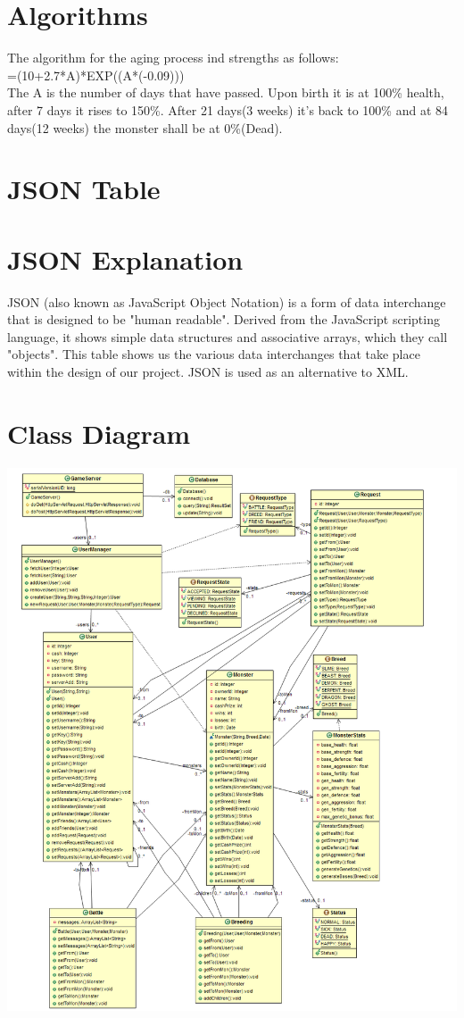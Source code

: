 \documentclass{project}
\begin{document}
\section{Algorithms}
The algorithm for the aging process ind strengths as follows:\\
=(10+2.7*A)*EXP((A*(-0.09)))\\
The A is the number of days that have passed. Upon birth it is at 100\% health, after 7 days it rises to 150\%. After 21 days(3 weeks) it's back to 100\% and at 84 days(12 weeks) the monster shall be at 0\%(Dead). 

\section{JSON Table}


\section{JSON Explanation}
JSON (also known as JavaScript Object Notation) is a form of data interchange that is designed to be "human readable". Derived from the JavaScript scripting language, it shows simple data structures and associative arrays, which they call "objects". This table shows us the various data interchanges that take place within the design of our project.  JSON is used as an alternative to XML.

\section{Class Diagram}
\includegraphics[scale=0.40]{MonsterDiagram.png}
\end{document}
